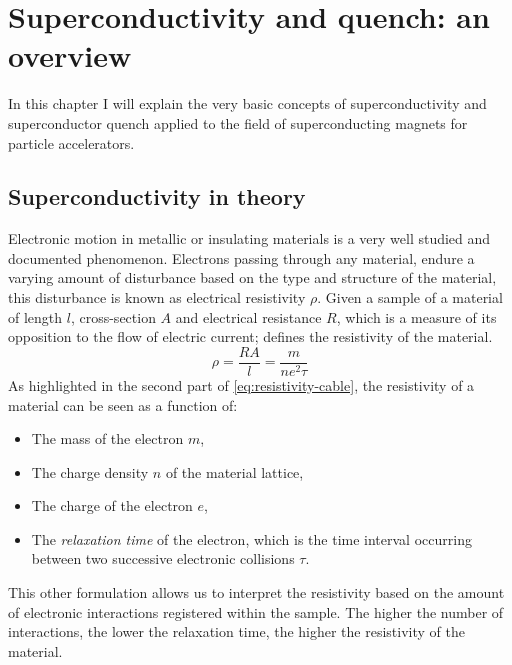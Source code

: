 \chapter{Superconductivity and quench: an overview}
\label{chp:soupcond-quench}
In this chapter I will explain the very basic concepts of superconductivity and
superconductor quench applied to the field of superconducting magnets for particle accelerators.
\section{Superconductivity in theory}
\label{sec:soupcond}
Electronic motion in metallic or insulating materials is a very well studied and documented
phenomenon. Electrons passing through any material, endure a varying amount of disturbance based on
the type and structure of the material, this disturbance is known as electrical resistivity $\rho$. Given a
sample of a material of length $l$, cross-section $A$ and electrical resistance $R$, which is a
measure of its opposition to the flow of electric current;  defines the
resistivity of the material.
\begin{equation}
	\label{eq:resistivity-cable}
	\rho = \frac{RA}{l} = \frac{m}{ne^2\tau}
\end{equation}
As highlighted in the second part of \cref{eq:resistivity-cable}, the resistivity of a
material can be seen as a function of:
\begin{itemize}
	\item The mass of the electron $m$,
	\item The charge density $n$ of the material lattice,
	\item The charge of the electron $e$,
	\item The \emph{relaxation time} of the electron, which is the time interval occurring between two
	      successive electronic collisions $\tau$.
\end{itemize}
This other formulation allows us to interpret the resistivity based on the amount of electronic
interactions registered within the sample. The higher the number of interactions, the lower the
relaxation time, the higher the resistivity of the material.


